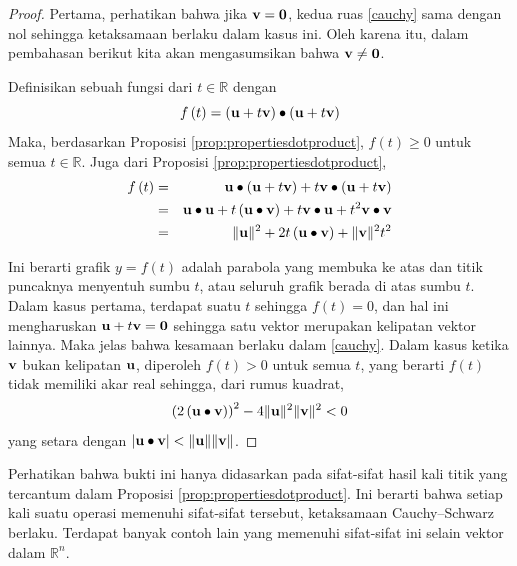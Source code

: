 \ifdefined\showproofs
\begin{proof}
Pertama, perhatikan bahwa jika $\mathbf{v}=\mathbf{0}$, kedua ruas \ref{cauchy}
sama dengan nol sehingga ketaksamaan berlaku dalam kasus ini. Oleh karena itu, dalam pembahasan berikut
kita akan mengasumsikan bahwa $\mathbf{v}\neq \mathbf{0}$.

Definisikan sebuah fungsi dari $t\in \mathbb{R}$ dengan
\begin{equation*}
f\left( t\right) =\left( \mathbf{u}+t\mathbf{v}\right) \bullet \left( \mathbf{u}+
t\mathbf{v}\right)
\end{equation*}
Maka, berdasarkan Proposisi \ref{prop:propertiesdotproduct}, $f\left( t\right) \geq 0$ untuk semua $t\in \mathbb{R}$.
Juga dari Proposisi \ref{prop:propertiesdotproduct},
\begin{eqnarray*}
f\left( t\right) &=&\mathbf{u}\bullet \left( \mathbf{u}+t\mathbf{v}\right) +
t\mathbf{v}\bullet \left( \mathbf{u}+t\mathbf{v}\right) \\
&=&\mathbf{u}\bullet \mathbf{u}+t\left( \mathbf{u}\bullet \mathbf{v}\right) + t \mathbf{v}\bullet \mathbf{u}+
t^{2}\mathbf{v}\bullet \mathbf{v} \\
&=&\| \mathbf{u}\| ^{2}+2t\left( \mathbf{u}\bullet \mathbf{v}\right) +\|
\mathbf{v}\| ^{2}t^{2}
\end{eqnarray*}

Ini berarti grafik $y=f\left( t\right) $ adalah parabola yang membuka
ke atas dan titik puncaknya menyentuh sumbu $t$, atau seluruh grafik berada
di atas sumbu $t$. Dalam kasus pertama, terdapat suatu $t$ sehingga $f\left(
t\right) =0$, dan hal ini mengharuskan $\mathbf{u}+t\mathbf{v}=\mathbf{0}$ sehingga satu vektor merupakan
kelipatan vektor lainnya. Maka jelas bahwa kesamaan berlaku dalam \ref{cauchy}. Dalam
kasus ketika $\mathbf{v}$ bukan kelipatan $\mathbf{u}$, diperoleh
$f\left( t\right) >0$ untuk semua $t$, yang berarti $f\left( t\right) $ tidak memiliki akar
real sehingga, dari rumus kuadrat,
\begin{equation*}
\left( 2\left( \mathbf{u}\bullet \mathbf{v}\right) \right) ^{2}-4\| \mathbf{u}
\| ^{2}\| \mathbf{v}\| ^{2}<0
\end{equation*}
yang setara dengan $\left\vert \mathbf{u}\bullet \mathbf{v} \right\vert
<\| \mathbf{u}\| \| \mathbf{v}\| $.
\end{proof}
\fi
Perhatikan bahwa bukti ini hanya didasarkan pada sifat-sifat
hasil kali titik yang tercantum dalam Proposisi \ref{prop:propertiesdotproduct}. Ini berarti bahwa
setiap kali suatu operasi memenuhi sifat-sifat tersebut, ketaksamaan Cauchy--Schwarz
berlaku. Terdapat banyak contoh lain yang memenuhi sifat-sifat ini selain vektor dalam
$\mathbb{R}^{n}$.

